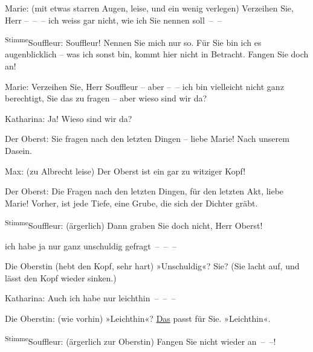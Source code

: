 \pstart
           Marie: (mit etwas starren Augen, leise, und ein wenig verlegen) Verzeihen Sie, Herr
               – – – ich weiss gar nicht, wie ich Sie nennen soll – –\pend
           
\pstart
           \substVorne{}\textsuperscript{Stimme}{\allowbreak}\substDazwischen{}Souffleur\substHinten{}: Souffleur! Nennen Sie mich nur so. Für Sie bin ich es augenblicklich – was
               ich sonst bin, kommt hier nicht in Betracht. Fangen Sie doch an!\pend
           
\pstart
           Marie: Verzeihen Sie, Herr Souffleur – aber – – ich bin vielleicht nicht ganz
               berechtigt, Sie das zu fragen – aber wieso sind wir da?\pend
           
\pstart
           Katharina: Ja! Wieso sind wir da?\pend
           
\pstart
           Der Oberst: Sie fragen nach den letzten Dingen – liebe Marie! Nach unserem
               Dasein.\pend
           
\pstart
           Max: (zu Albrecht leise) Der Oberst ist ein gar zu witziger Kopf!\pend
           
\pstart
           Der Oberst: Die  Fragen nach den letzten Dingen,
               für den letzten Akt, liebe Marie! Vorher, ist jede Tiefe, eine Grube, die sich der
               Dichter gräbt.\pend
           
\pstart
           \substVorne{}\textsuperscript{Stimme}{\allowbreak}\substDazwischen{}Souffleur\substHinten{}: (ärgerlich) Dann graben Sie doch nicht, Herr Oberst!\pend
           
\pstart
           \label{T_L01900-1v}\label{T_L01900-1h} ich habe ja
               nur ganz unschuldig gefragt – – –\pend
           
\pstart
           Die Oberstin (hebt den Kopf, sehr hart) \introOben{}»\introOben{}Unschuldig\introOben{}«\introOben{}? Sie? (Sie lacht auf, und lässt den Kopf wieder
               sinken.)\pend
           
\pstart
           Katharina: Auch ich habe nur leichthin – – –\pend
           
\pstart
           Die Oberstin: (wie vorhin) »Leichthin«? \uline{Das} passt für
               Sie. »Leichthin«.\pend
           
\pstart
           \substVorne{}\textsuperscript{Stimme}{\allowbreak}\substDazwischen{}Souffleur\substHinten{}: (ärgerlich zur Oberstin) Fangen Sie nicht wieder an – –!\pend
           
